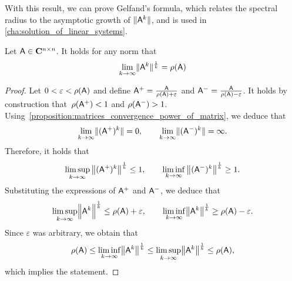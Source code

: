 With this result,
we can prove Gelfand's formula,
which relates the spectral radius to the asymptotic growth of $\lVert\mathsf A^k\rVert$,
and is used in \cref{cha:solution_of_linear_systems}.
\begin{proposition}
    \label{proposition:matrices_gelfands}
    Let $\mathsf A \in \mathbf C^{n \times n}$.
    It holds for any norm that
    \[
        \lim_{k \to \infty} \lVert\mathsf A^k\rVert^{\frac{1}{k}} = \rho(\mathsf A)
    \]
\end{proposition}
\begin{proof}
    Let $0 < \varepsilon < \rho(\mathsf A)$
    and define $\mathsf A^+ = \frac{\mathsf A}{\rho(\mathsf A) + \varepsilon}$ and $\mathsf A^- = \frac{\mathsf A}{\rho(\mathsf A) - \varepsilon}$.
    It holds by construction that~$\rho(\mathsf A^+) < 1$ and $\rho(\mathsf A^-) > 1$.
    Using~\cref{proposition:matrices_convergence_power_of_matrix}, we deduce that
    \[
        \lim_{k \to \infty} \lVert(\mathsf A^+)^k\rVert = 0, \qquad \lim_{k \to \infty} \lVert(\mathsf A^-)^k\rVert = \infty.
    \]
    Therefore, it holds that
    \[
        \limsup_{k \to \infty} \left\lVert (\mathsf A^+)^k \right\rVert^{\frac{1}{k}} \leq 1,
        \qquad
        \liminf_{k \to \infty} \left\lVert (\mathsf A^-)^k \right\rVert^{\frac{1}{k}} \geq 1.
    \]
    Substituting the expressions of $\mathsf A^+$ and $\mathsf A^-$,
    we deduce that
    \[
        \limsup_{k \to \infty} \Bigl\lVert \mathsf A^k \Bigr\rVert^{\frac{1}{k}} \leq \rho(\mathsf A) + \varepsilon,
        \qquad
        \liminf_{k \to \infty} \bigl\lVert \mathsf A^k \bigr\rVert^{\frac{1}{k}} \geq \rho(\mathsf A) - \varepsilon.
    \]
    Since $\varepsilon$ was arbitrary, we obtain that
    \[
        \rho(\mathsf A) 
        \leq \liminf_{k \to \infty} \bigl\lVert \mathsf A^k \bigr\rVert^{\frac{1}{k}} 
        \leq \limsup_{k \to \infty} \bigl\lVert \mathsf A^k \bigr\rVert^{\frac{1}{k}}
        \leq \rho(\mathsf A),
    \]
    which implies the statement.
\end{proof}
